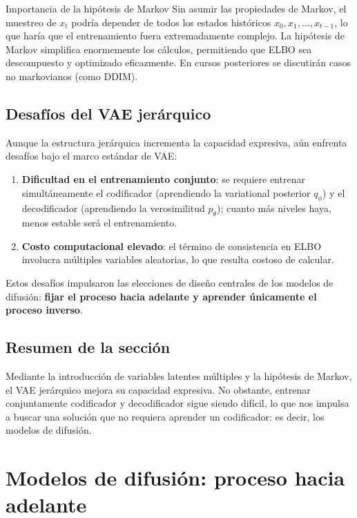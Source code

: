 \documentclass[a4paper]{article}
\begin{document}
\begin{importantbox}{Importancia de la hipótesis de Markov}
Sin asumir las propiedades de Markov, el muestreo de $x_t$ podría depender de todos los estados históricos $x_0, x_1, \ldots, x_{t-1}$, lo que haría que el entrenamiento fuera extremadamente complejo. La hipótesis de Markov simplifica enormemente los cálculos, permitiendo que ELBO sea descompuesto y optimizado eficazmente. En cursos posteriores se discutirán casos no markovianos (como DDIM).
\end{importantbox}

\subsection{Desafíos del VAE jerárquico}

Aunque la estructura jerárquica incrementa la capacidad expresiva, aún enfrenta desafíos bajo el marco estándar de VAE:

\begin{enumerate}
    \item \textbf{Dificultad en el entrenamiento conjunto}: se requiere entrenar simultáneamente el codificador (aprendiendo la variational posterior $q_\phi$) y el decodificador (aprendiendo la verosimilitud $p_\theta$); cuanto más niveles haya, menos estable será el entrenamiento.
    \item \textbf{Costo computacional elevado}: el término de consistencia en ELBO involucra múltiples variables aleatorias, lo que resulta costoso de calcular.
\end{enumerate}

Estos desafíos impulsaron las elecciones de diseño centrales de los modelos de difusión: \textbf{fijar el proceso hacia adelante y aprender únicamente el proceso inverso}.

\subsection{Resumen de la sección}

Mediante la introducción de variables latentes múltiples y la hipótesis de Markov, el VAE jerárquico mejora su capacidad expresiva. No obstante, entrenar conjuntamente codificador y decodificador sigue siendo difícil, lo que nos impulsa a buscar una solución que no requiera aprender un codificador: es decir, los modelos de difusión.



\section{Modelos de difusión: proceso hacia adelante}
\end{document}
